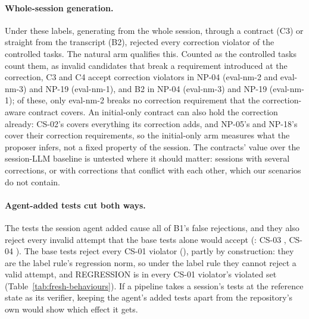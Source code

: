\paragraph{Whole-session generation.} Under these labels, generating from the whole session, through a contract (C3) or straight from the transcript (B2), rejected every correction violator of the controlled tasks. The natural arm qualifies this. Counted as the controlled tasks count them, as invalid candidates that break a requirement introduced at the correction, C3 and C4 accept correction violators in NP-04 (eval-nm-2 and eval-nm-3) and NP-19 (eval-nm-1), and B2 in NP-04 (eval-nm-3) and NP-19 (eval-nm-1); of these, only eval-nm-2 breaks no correction requirement that the correction-aware contract covers. An initial-only contract can also hold the correction already: CS-02's covers everything its correction adds, and NP-05's and NP-18's cover their correction requirements, so the initial-only arm measures what the proposer infers, not a fixed property of the session. The contracts' value over the session-LLM baseline is untested where it should matter: sessions with several corrections, or with corrections that conflict with each other, which our scenarios do not contain.

\paragraph{Agent-added tests cut both ways.} The tests the session agent added cause all  of B1's false rejections, and they also reject every invalid attempt that the base tests alone would accept (: CS-03 , CS-04 ). The base tests reject every CS-01 violator (), partly by construction: they are the label rule's regression norm, so under the label rule they cannot reject a valid attempt, and REGRESSION is in every CS-01 violator's violated set (Table~\ref{tab:fresh-behaviours}). If a pipeline takes a session's tests at the reference state as its verifier, keeping the agent's added tests apart from the repository's own would show which effect it gets.

